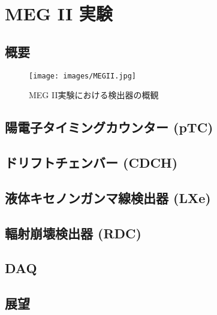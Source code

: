 \documentclass[Yonemoto_master.tex]{subfiles}
\begin{document}
\chapter{MEG II 実験}
\section{概要}
\begin{figure}[h]
\begin{center}
\texttt{[image: images/MEGII.jpg]}
\caption{MEG II実験における検出器の概観}
\end{center}
\end{figure}
\section{陽電子タイミングカウンター (pTC)}
\section{ドリフトチェンバー (CDCH)}
\section{液体キセノンガンマ線検出器 (LXe)}
\section{輻射崩壊検出器 (RDC)}
\section{DAQ}
\section{展望}

{  }{
\begin{thebibliography}{99}
\end{thebibliography}
}
\end{document}
